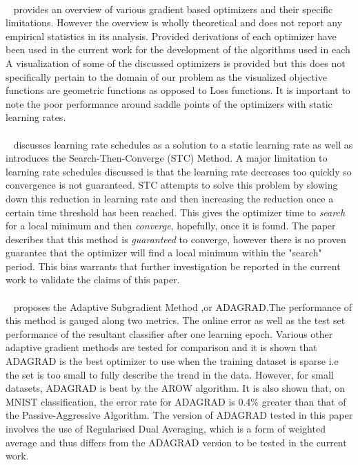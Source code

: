 \documentclass{article}
\begin{document}
\paragraph{}~\citet{ruder2016overview} provides an overview of various gradient based optimizers and their specific limitations. However the overview is wholly theoretical and does not report any empirical statistics in its analysis.
Provided derivations of each optimizer have been used in the current work for the development of the algorithms used in each  A visualization of some of the discussed optimizers is provided but this does not specifically pertain to the domain of our problem as the visualized objective functions are geometric functions as opposed to Loss functions. It is important to note the poor performance around saddle points of the optimizers with static learning rates.


\paragraph{}~\citet{darken1991note} discusses learning rate schedules as a solution to a static learning rate as well as introduces the Search-Then-Converge (STC) Method. A major limitation to learning rate schedules discussed is that the learning rate decreases too quickly so convergence is not guaranteed. STC attempts to solve this problem by slowing down this reduction in learning rate and then increasing the reduction once a certain time threshold has been reached. This gives the optimizer time to \textit{search} for a local minimum and then \textit{converge}, hopefully, once it is found. The paper describes that this method is \textit{guaranteed} to converge, however there is no proven guarantee that the optimizer will find a local minimum within the "search" period. This bias warrants that further investigation be reported in the current work to validate the claims of this paper.

\paragraph{}~\citet{duchi2011adaptive} proposes the Adaptive Subgradient Method ,or ADAGRAD.The performance of this method is gauged along two metrics. The online error as well as the test set performance of the resultant classifier after one learning epoch. Various other adaptive gradient methods are tested for comparison and it is shown that ADAGRAD is the best optimizer to use when the training dataset is sparse i.e the set is too small to fully describe the trend in the data. However, for small datasets, ADAGRAD is beat by the AROW algorithm. It is also shown that, on MNIST classification, the error rate for ADAGRAD is 0.4\% greater than that of the Passive-Aggressive Algorithm. The version of ADAGRAD tested in this paper involves the use of Regularised Dual Averaging, which is a form of weighted average and thus differs from the ADAGRAD version to be tested in the current work.
\end{document}

